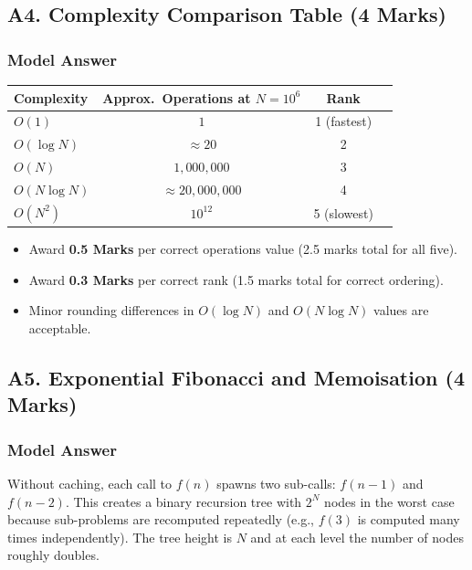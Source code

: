 \documentclass[11pt,a4paper]{article}
\newenvironment{markbox}[1]{%
    \begin{tcolorbox}[colback=markgreen!6!white, colframe=markgreen, title=\textbf{Mark Allocation --- #1}]
}{%
    \end{tcolorbox}
}
\begin{document}
\subsection*{A4. Complexity Comparison Table (4 Marks)}

\subsubsection*{Model Answer}

\begin{center}
\begin{tabular}{lccc}
    \toprule
    \textbf{Complexity} & \textbf{Approx.\ Operations at $N = 10^6$} & \textbf{Rank} \\
    \midrule
    $O(1)$        & $1$                       & 1 (fastest) \\
    $O(\log N)$   & $\approx 20$              & 2 \\
    $O(N)$        & $1{,}000{,}000$           & 3 \\
    $O(N \log N)$ & $\approx 20{,}000{,}000$  & 4 \\
    $O(N^2)$      & $10^{12}$                 & 5 (slowest) \\
    \bottomrule
\end{tabular}
\end{center}

\begin{markbox}{A4 --- 4 Marks}
\begin{itemize}
    \item Award \textbf{0.5 Marks} per correct operations value (2.5 marks total for all five).
    \item Award \textbf{0.3 Marks} per correct rank (1.5 marks total for correct ordering).
    \item Minor rounding differences in $O(\log N)$ and $O(N \log N)$ values are acceptable.
\end{itemize}
\end{markbox}

\subsection*{A5. Exponential Fibonacci and Memoisation (4 Marks)}

\subsubsection*{Model Answer}
Without caching, each call to $f(n)$ spawns two sub-calls: $f(n-1)$ and $f(n-2)$. This creates a binary recursion tree with $2^N$ nodes in the worst case because sub-problems are recomputed repeatedly (e.g., $f(3)$ is computed many times independently). The tree height is $N$ and at each level the number of nodes roughly doubles.
\end{document}
